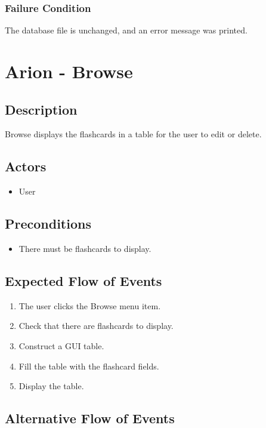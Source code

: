 \documentclass{scrreprt}
\begin{document}
    \subsection{Failure Condition}
    The database file is unchanged, and an error message was printed.

\chapter{Arion - Browse}

\section{Description}
Browse displays the flashcards in a table for the user to edit or delete.

\section{Actors}
\begin{itemize}
    \item User
\end{itemize}

\section{Preconditions}
\begin{itemize}
    \item There must be flashcards to display.
\end{itemize}

\section{Expected Flow of Events}
\begin{enumerate}[1.]
    \item The user clicks the Browse menu item.
    \item Check that there are flashcards to display.
    \item Construct a GUI table.
    \item Fill the table with the flashcard fields.
    \item Display the table.
\end{enumerate}

\section{Alternative Flow of Events}
\end{document}
